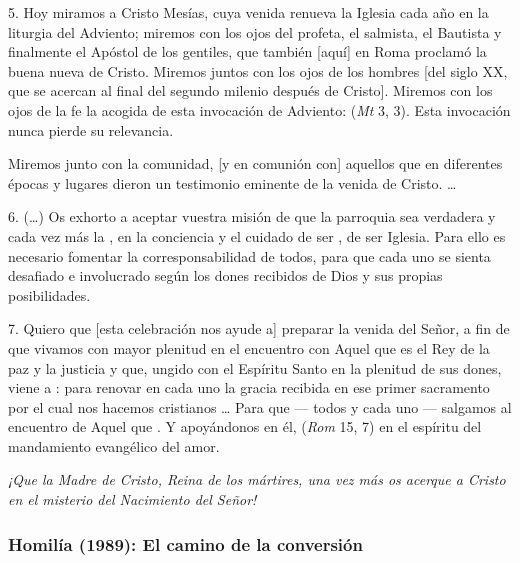 \begin{body}
	5. Hoy miramos a Cristo Mesías, cuya venida renueva la Iglesia cada año en la liturgia del Adviento; miremos con los ojos del profeta, el salmista, el Bautista y finalmente el Apóstol de los gentiles, que también {[}aquí{]} en Roma proclamó la buena nueva de Cristo. Miremos juntos con los ojos de los hombres {[}del siglo XX, que se acercan al final del segundo milenio después de Cristo{]}. Miremos con los ojos de la fe la acogida de esta invocación de Adviento:  (\emph{Mt} 3, 3). Esta invocación nunca pierde su relevancia. 
	
	Miremos junto con la comunidad, {[}y en comunión con{]} aquellos que en diferentes épocas y lugares dieron un testimonio eminente de la venida de Cristo. {\ldots{}} 
	
	6. (\ldots{}) Os exhorto a aceptar vuestra misión de que la parroquia sea verdadera y cada vez más la , en la conciencia y el cuidado de ser , de ser Iglesia. Para ello es necesario fomentar la corresponsabilidad de todos, para que cada uno se sienta desafiado e involucrado según los dones recibidos de Dios y sus propias posibilidades. 
	
	7.  Quiero que {[}esta celebración nos ayude a{]} preparar la venida del Señor, a fin de que vivamos con mayor plenitud en el encuentro con Aquel que es el Rey de la paz y la justicia y que, ungido con el Espíritu Santo en la plenitud de sus dones, viene a : para renovar en cada uno la gracia recibida en ese primer sacramento por el cual nos hacemos cristianos \ldots{} Para que --- todos y cada uno --- salgamos al encuentro de Aquel que . Y apoyándonos en él,  (\emph{Rom} 15, 7) en el espíritu del mandamiento evangélico del amor. 
	
	\emph{¡Que la Madre de Cristo, Reina de los mártires, una vez más os acerque a Cristo en el misterio del Nacimiento del Señor!}
\end{body}

\subsubsection{Homilía (1989): El camino de la conversión}


